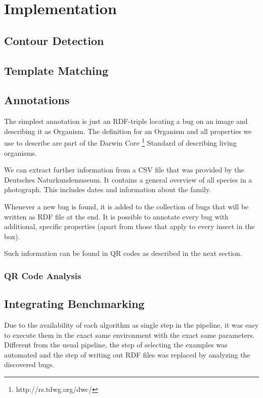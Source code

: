 \section{Implementation}
\label{sec_implementation}

\subsection{Contour Detection}
\subsection{Template Matching}


\subsection{Annotations}
The simplest annotation is just an RDF-triple locating a bug on an image and describing it as Organism. 
The definition for an Organism and all properties we use to describe are part of the Darwin Core \footnote{http://rs.tdwg.org/dwc/} Standard of describing living organisms.

We can extract further information from a CSV file that was provided by the Deutsches Naturkundemuseum.
It contains a general overview of all species in a photograph. 
This includes dates and information about the family.

Whenever a new bug is found, it is added to the collection of bugs that will be written as RDF file at the end.
It is possible to annotate every bug with additional, specific properties (apart from those that apply to every insect in the box).

Such information can be found in QR codes as described in the next section.

\subsubsection{QR Code Analysis}

\subsection{Integrating Benchmarking}
Due to the availability of each algorithm as single step in the pipeline, it was easy to execute them in the exact same environment with the exact same parameters. 
Different from the usual pipeline, the step of selecting the examples was automated and the step of writing out RDF files was replaced by analyzing the discovered bugs.

